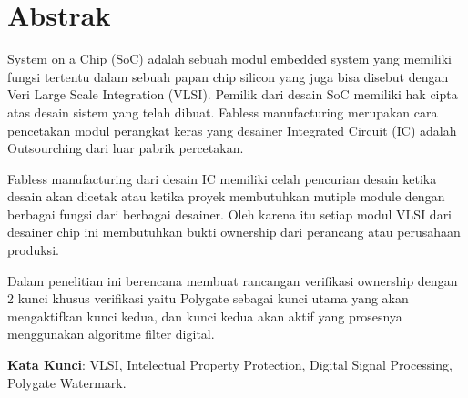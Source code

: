 %
%
%

\chapter*{Abstrak}

\vspace*{0.2cm}
\noindent System on a Chip (SoC) adalah sebuah modul embedded system yang
memiliki fungsi tertentu dalam sebuah papan chip silicon yang juga bisa disebut
dengan Veri Large Scale Integration (VLSI). Pemilik dari desain SoC memiliki
hak cipta atas desain sistem yang telah dibuat. Fabless manufacturing merupakan
cara pencetakan modul perangkat keras yang desainer Integrated Circuit (IC)
adalah Outsourching dari luar pabrik percetakan.

\vspace*{0.2cm}
\noindent Fabless manufacturing dari desain IC memiliki celah pencurian desain
ketika desain akan dicetak atau ketika proyek membutuhkan mutiple module
dengan berbagai fungsi dari berbagai desainer. Oleh karena itu setiap modul VLSI
dari desainer chip ini membutuhkan bukti ownership dari perancang atau
perusahaan produksi.

\vspace*{0.2cm}
\noindent Dalam penelitian ini berencana membuat rancangan verifikasi ownership
dengan 2 kunci khusus verifikasi yaitu Polygate sebagai kunci utama yang akan
mengaktifkan kunci kedua, dan kunci kedua akan aktif yang prosesnya
menggunakan algoritme filter digital.

\vspace*{0.2cm}

\noindent \textbf{Kata Kunci}: VLSI, Intelectual Property Protection, Digital Signal Processing, Polygate Watermark.

\newpage
